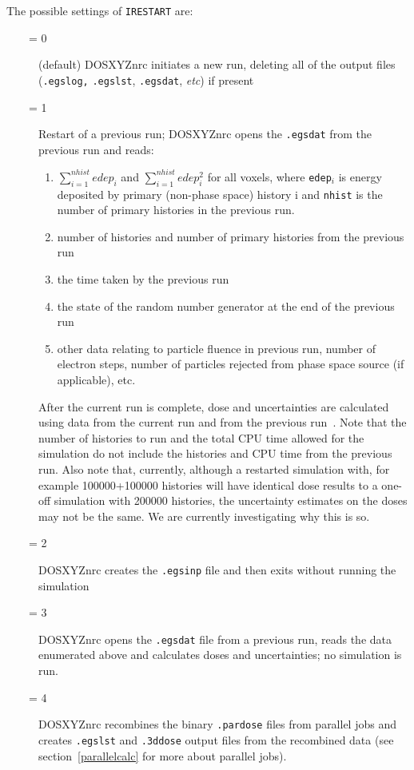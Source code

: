\documentclass[12pt,twoside]{article}      %
\newcommand{\etc}{{\em etc}}
\newcommand{\indexm}[1]{\index{#1}}
\begin{document}
\indexm{.egsdat}
The possible settings of {\tt IRESTART} are:
\begin{description}
\item [~~~~= 0] (default) DOSXYZnrc initiates a new run, deleting all of the output
files ({\tt .egslog,} {\tt .egslst}, {\tt .egsdat}, \etc) if present
\item [~~~~= 1] Restart of a previous run; DOSXYZnrc opens the
{\tt .egsdat} from the previous run and reads:
\begin{enumerate}
\item $\sum_{i=1}^{nhist}edep_i$ and $\sum_{i=1}^{nhist}edep_i^2$ for
all voxels, where {\tt edep$_i$} is energy deposited by primary (non-phase space)
history i
and {\tt nhist} is the number of primary histories in the previous run.
\item number of histories and number of primary histories from the previous run
\item the time taken by the previous run
\item the state of the random number generator at the end of the
previous run
\item other data relating to particle fluence in previous run, number of
electron steps, number of particles rejected from phase space source (if
applicable), etc.
\end{enumerate}
After the current run is complete, dose and
uncertainties are calculated using data from the current run and from
the previous run~\cite{Wa02a}.  Note that the
number of histories to run and the total CPU time allowed for the
simulation do not include the histories and CPU time from the previous run.
Also note that, currently, although a restarted simulation with, for example
100000+100000 histories will have identical dose results to a one-off
simulation
with 200000 histories, the uncertainty estimates on the doses may not be
the same.  We are currently investigating why this is so.
\item [~~~~= 2] DOSXYZnrc creates the {\tt .egsinp} file and then exits without
running the simulation
\item [~~~~= 3] DOSXYZnrc opens the {\tt .egsdat} file from a previous run,
reads the data enumerated above and calculates doses and uncertainties;
no simulation is run.
\indexm{.pardose}
\item [~~~~= 4] DOSXYZnrc recombines the binary {\tt .pardose} files from
parallel jobs and creates {\tt .egslst} and {\tt .3ddose} output
files from the recombined data (see section~\ref{parallelcalc} for
more about parallel jobs).
\end{description}
\end{document}
